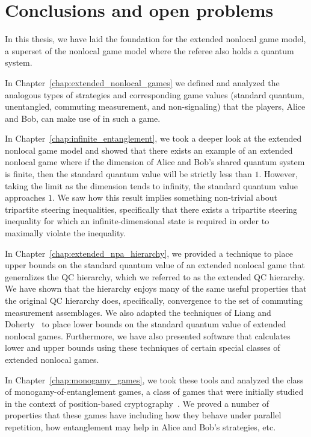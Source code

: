 \chapter{Conclusions and open problems}
\label{chap:conclusions}

In this thesis, we have laid the foundation for the extended nonlocal game model, a superset of the nonlocal game model where the referee also holds a quantum system. 

In Chapter~\ref{chap:extended_nonlocal_games} we defined and analyzed the analogous types of strategies and corresponding game values (standard quantum, unentangled, commuting measurement, and non-signaling) that the players, Alice and Bob, can make use of in such a game. 

In Chapter~\ref{chap:infinite_entanglement}, we took a deeper look at the extended nonlocal game model and showed that there exists an example of an extended nonlocal game where if the dimension of Alice and Bob's shared quantum system is finite, then the standard quantum value will be strictly less than $1$. However, taking the limit as the dimension tends to infinity, the standard quantum value approaches $1$. We saw how this result implies something non-trivial about tripartite steering inequalities, specifically that there exists a tripartite steering inequality for which an infinite-dimensional state is required in order to maximally violate the inequality. 

In Chapter~\ref{chap:extended_npa_hierarchy}, we provided a technique to place upper bounds on the standard quantum value of an extended nonlocal game that generalizes the QC hierarchy, which we referred to as the extended QC hierarchy. We have shown that the hierarchy enjoys many of the same useful properties that the original QC hierarchy does, specifically, convergence to the set of commuting measurement assemblages. We also adapted the techniques of Liang and Doherty~\cite{Liang2007} to place lower bounds on the standard quantum value of extended nonlocal games. Furthermore, we have also presented software that calculates lower and upper bounds using these techniques of certain special classes of extended nonlocal games.

In Chapter~\ref{chap:monogamy_games}, we took these tools and analyzed the class of monogamy-of-entanglement games, a class of games that were initially studied in the context of position-based cryptography~\cite{Tomamichel2013}. We proved a number of properties that these games have including how they behave under parallel repetition, how entanglement may help in Alice and Bob's strategies, etc. 

